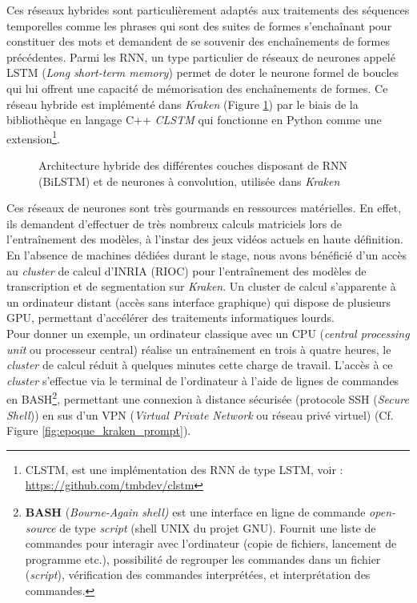 Ces réseaux hybrides sont particulièrement adaptés aux traitements des séquences temporelles comme les phrases qui sont des suites de formes s'enchaînant pour constituer des mots et demandent de se souvenir des enchaînements de formes précédentes. Parmi les RNN, un type particulier de réseaux de neurones appelé LSTM (\textit{Long short-term memory}) permet de doter le neurone formel de boucles qui lui offrent une capacité de mémorisation des enchaînements de formes. Ce réseau hybride est implémenté dans \textit{Kraken} (Figure \ref{fig:graph_neurones_artificiels}) par le biais de la bibliothèque en langage C++ \textit{CLSTM} qui fonctionne en Python comme une extension\footnote{CLSTM, est une implémentation des RNN de type LSTM, voir : \url{https://github.com/tmbdev/clstm}}. 
\begin{figure}[h!]
    \centering
    \centerline{}
    \caption{Architecture hybride des différentes couches disposant de RNN (BiLSTM) et de neurones à convolution, utilisée dans \textit{Kraken} \textcopyright \cite{kiessling_kraken_2019}}
    \label{fig:graph_neurones_artificiels}
\end{figure}
\newpage
Ces réseaux de neurones sont très gourmands en ressources matérielles. En effet, ils demandent d'effectuer de très nombreux calculs matriciels lors de l'entraînement des modèles, à l'instar des jeux vidéos actuels en haute définition. En l'absence de machines dédiées durant le stage, nous avons bénéficié d'un accès au \textit{cluster} de calcul d'INRIA (RIOC) pour l'entraînement des modèles de transcription et de segmentation sur \textit{Kraken}. Un cluster de calcul s'apparente à un ordinateur distant (accès sans interface graphique) qui dispose de plusieurs GPU, permettant d'accélérer des traitements informatiques lourds.\\ 

Pour donner un exemple, un ordinateur classique avec un CPU (\textit{central processing unit} ou processeur central) réalise un entraînement en trois à quatre heures, le \textit{cluster} de calcul réduit à quelques minutes cette charge de travail. L'accès à ce \textit{cluster} s'effectue via le terminal de l'ordinateur à l'aide de lignes de commandes en BASH\footnote{\textbf{BASH} (\textit{Bourne-Again shell)} est une interface en ligne de commande \textit{open-source} de type \textit{script} (shell UNIX du projet GNU). Fournit une liste de commandes pour interagir avec l'ordinateur (copie de fichiers, lancement de programme etc.), possibilité de regrouper les commandes dans un fichier (\textit{script}), vérification des commandes interprétées, et interprétation des commandes.}, permettant une connexion à distance sécurisée (protocole SSH (\textit{Secure Shell})) en sus d'un VPN (\textit{Virtual Private Network} ou réseau privé virtuel) (Cf. Figure \ref{fig:epoque_kraken_prompt}).
\newpage
